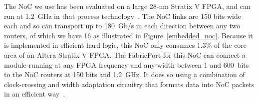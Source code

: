 The NoC we use has been evaluated on a large 28-nm Stratix V FPGA, and can run at 1.2~GHz in that process technology~\cite{abdelfattah2015take}.
The NoC links are 150 bits wide each and so can transport up to 180~Gb/s in each direction between any two routers, of which we have 16 as illustrated in Figure~\ref{embedded_noc}.
Because it is implemented in efficient hard logic, this NoC only consumes 1.3\% of the core area of an Altera Stratix V FPGA.
The FabricPort for this NoC can connect a module running at any FPGA frequency and any width between 1 and 600~bits to the NoC routers at 150 bits and 1.2~GHz.
It does so using a combination of clock-crossing and width adaptation circuitry that formats data into NoC packets in an efficient way~\cite{abdelfattah2015take}.




